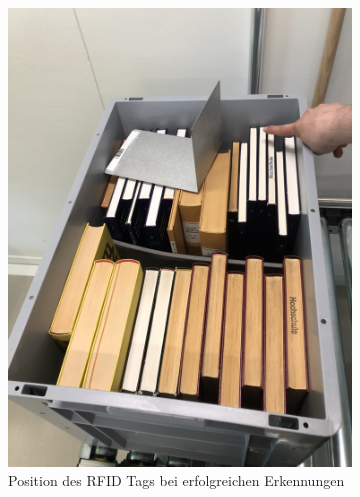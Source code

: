\documentclass[parskip=full, a4paper]{scrartcl}
\begin{document}
\begin{figure}[htb]
	\centering
	\begin{subfigure}{0.48\linewidth}
		\includegraphics[keepaspectratio,width=\linewidth]{img/RFIDPositionErfolgreich.jpg}
		\caption{Position des RFID Tags bei erfolgreichen Erkennungen}
	\end{subfigure}
	\begin{subfigure}{0.48\linewidth}

\end{subfigure}
\end{figure}
\end{document}
